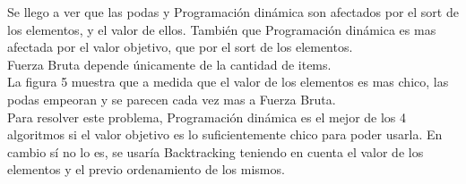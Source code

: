 Se llego a ver que las podas y Programación dinámica son afectados por el sort de los elementos, y el valor de ellos.
También que Programación dinámica es mas afectada por el valor objetivo, que por el sort de los elementos.\\
Fuerza Bruta depende únicamente de la cantidad de items.\\
La figura 5 muestra que a medida que el valor de los elementos es mas chico, las podas empeoran y se parecen cada vez mas a Fuerza Bruta.\\
Para resolver este problema, Programación dinámica es el mejor de los 4 algoritmos si el valor objetivo es lo suficientemente chico para poder usarla. En cambio sí no lo es, se usaría Backtracking teniendo en cuenta el valor de los elementos y el previo ordenamiento de los mismos.\\